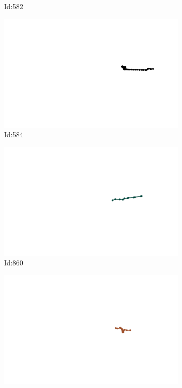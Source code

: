 \documentclass[12pt,twoside]{report}
\begin{document}
\begin{figure}
\begin{subfigure}[b]{0.20\textwidth}
\caption{Id:582}
\end{subfigure}
\begin{subfigure}[b]{0.20\textwidth}
\centering
\includegraphics[width=\textwidth]{../../trajectories/584.png}
\caption{Id:584}
\end{subfigure}
\begin{subfigure}[b]{0.20\textwidth}
\centering
\includegraphics[width=\textwidth]{../../trajectories/860.png}
\caption{Id:860}
\end{subfigure}
\begin{subfigure}[b]{0.20\textwidth}
\centering
\includegraphics[width=\textwidth]{../../trajectories/901.png}

\end{subfigure}
\end{figure}
\end{document}
